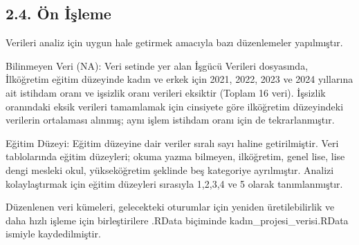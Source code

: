 \documentclass[
  11pt,
  a4paper,
  DIV=11,
  numbers=noendperiod]{scrartcl}
\begin{document}
\subsection{2.4. Ön İşleme}\label{uxf6n-iux15fleme}

Verileri analiz için uygun hale getirmek amacıyla bazı düzenlemeler
yapılmıştır.

Bilinmeyen Veri (NA): Veri setinde yer alan İşgücü Verileri dosyasında,
İlköğretim eğitim düzeyinde kadın ve erkek için 2021, 2022, 2023 ve 2024
yıllarına ait istihdam oranı ve işsizlik oranı verileri eksiktir (Toplam
16 veri). İşsizlik oranındaki eksik verileri tamamlamak için cinsiyete
göre ilköğretim düzeyindeki verilerin ortalaması alınmış; aynı işlem
istihdam oranı için de tekrarlanmıştır.

Eğitim Düzeyi: Eğitim düzeyine dair veriler sıralı sayı haline
getirilmiştir. Veri tablolarında eğitim düzeyleri; okuma yazma bilmeyen,
ilköğretim, genel lise, lise dengi mesleki okul, yükseköğretim şeklinde
beş kategoriye ayrılmıştır. Analizi kolaylaştırmak için eğitim düzeyleri
sırasıyla 1,2,3,4 ve 5 olarak tanımlanmıştır.

Düzenlenen veri kümeleri, gelecekteki oturumlar için yeniden
üretilebilirlik ve daha hızlı işleme için birleştirilere .RData
biçiminde kadın\_projesi\_verisi.RData ismiyle kaydedilmiştir.
\end{document}
